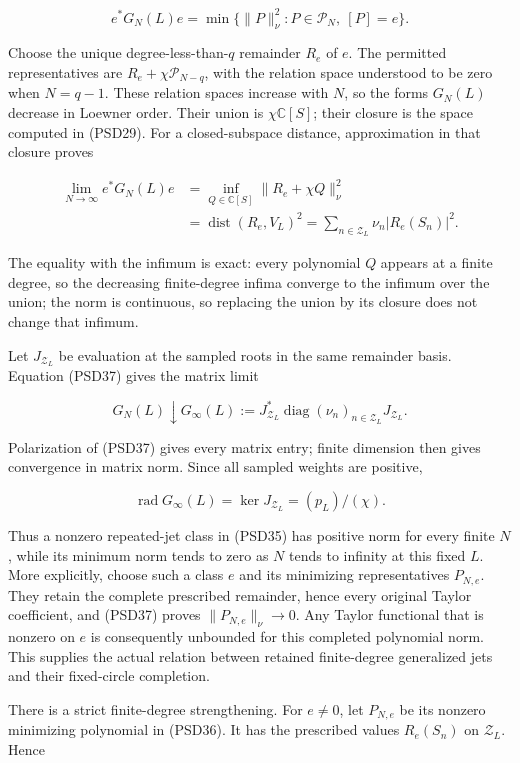 \[
e^*G_N(L)e=
\min\{\|P\|_\nu^2:P\in\mathcal P_N,\ [P]=e\}.
\tag{PSD36}
\]

Choose the unique degree-less-than-\(q\) remainder \(R_e\) of \(e\). The permitted representatives are \(R_e+\chi\mathcal P_{N-q}\), with the relation space understood to be zero when \(N=q-1\). These relation spaces increase with \(N\), so the forms \(G_N(L)\) decrease in Loewner order. Their union is \(\chi \mathbb C[S]\); their closure is the space computed in (PSD29). For a closed-subspace distance, approximation in that closure proves

\[
\begin{aligned}
\lim_{N\to\infty}e^*G_N(L)e
&=\inf_{Q\in\mathbb C[S]}\|R_e+\chi Q\|_\nu^2\\
&=\operatorname{dist}(R_e,V_L)^2
=\sum_{n\in\mathcal Z_L}\nu_n|R_e(S_n)|^2.
\end{aligned}
\tag{PSD37}
\]

The equality with the infimum is exact: every polynomial \(Q\) appears at a finite degree, so the decreasing finite-degree infima converge to the infimum over the union; the norm is continuous, so replacing the union by its closure does not change that infimum.

Let \(J_{\mathcal Z_L}\) be evaluation at the sampled roots in the same remainder basis. Equation (PSD37) gives the matrix limit

\[
G_N(L)\downarrow
G_\infty(L):=J_{\mathcal Z_L}^*
\operatorname{diag}(\nu_n)_{n\in\mathcal Z_L}J_{\mathcal Z_L}.
\tag{PSD38}
\]

Polarization of (PSD37) gives every matrix entry; finite dimension then gives convergence in matrix norm. Since all sampled weights are positive,

\[
\operatorname{rad}G_\infty(L)=\ker J_{\mathcal Z_L}
=(p_L)/(\chi).
\tag{PSD39}
\]

Thus a nonzero repeated-jet class in (PSD35) has positive norm for every finite \(N\), while its minimum norm tends to zero as \(N\) tends to infinity at this fixed \(L\). More explicitly, choose such a class \(e\) and its minimizing representatives \(P_{N,e}\). They retain the complete prescribed remainder, hence every original Taylor coefficient, and (PSD37) proves \(\|P_{N,e}\|_\nu\longrightarrow0\). Any Taylor functional that is nonzero on \(e\) is consequently unbounded for this completed polynomial norm. This supplies the actual relation between retained finite-degree generalized jets and their fixed-circle completion.

There is a strict finite-degree strengthening. For \(e \ne  0\), let \(P_{N,e}\) be its nonzero minimizing polynomial in (PSD36). It has the prescribed values \(R_e(S_n)\) on \(\mathcal Z_L\). Hence

